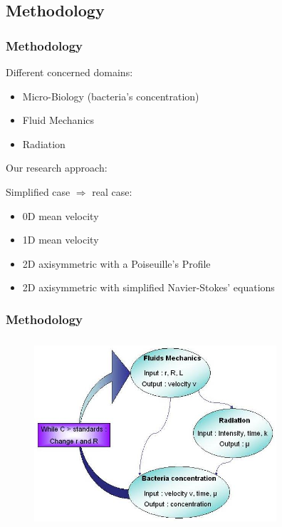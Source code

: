 \documentclass[xcolor=dvipsnames,10pt]{beamer}
\begin{document}
\subsection{Methodology}

\begin{frame}
	\frametitle{Methodology}
\begin{block}{Different concerned domains:}
\begin{itemize}[<+->]
\item Micro-Biology (bacteria's concentration)
\item Fluid Mechanics
\item Radiation
\end{itemize}
\end{block}
\pause
{} {Our research approach: }
\begin{block}{Simplified case $\Rightarrow$ real case:}
\begin{itemize}[<+->]
\item 0D mean velocity
\item 1D mean velocity
\item 2D axisymmetric with a Poiseuille's Profile
\item 2D axisymmetric with simplified Navier-Stokes' equations
\end{itemize}
\end{block}
\end{frame}


\begin{frame}
	\frametitle{Methodology}
	\begin{figure}
		\includegraphics[width=9cm,height=7cm]{./images/methodology2.jpg}
	\end{figure}
\end{frame}
\end{document}
